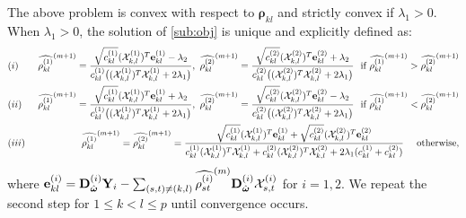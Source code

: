 \documentclass[useAMS,usenatbib,referee]{bio}
\newcommand{\bs}{\boldsymbol}
\begin{document}
{{The above problem is convex with respect to $\bs{\rho}_{kl}$ and strictly convex if $\lambda_1 > 0$. When $\lambda_1 > 0$, the solution of \eqref{sub:obj} is unique and explicitly defined as:
\begin{eqnarray} \nonumber
&(i)&~\displaystyle \widehat{\rho^{(1)}_{kl}}^{(m+1)}
= \frac{\sqrt{c^{(1)}_{kl}}(\mathcal{X}^{(1)}_{k,l})^T{\bf e}^{(1)}_{kl} - \lambda_2 }{c^{(1)}_{kl}\big((\mathcal{X}^{(1)}_{k,l})^T
\mathcal{X}^{(1)}_{k,l}+2\lambda_1\big)},~ 
\widehat{\rho^{(2)}_{kl}}^{(m+1)}
= \frac{\sqrt{c^{(2)}_{kl}}(\mathcal{X}^{(2)}_{k,l})^T{\bf e}^{(2)}_{kl} + \lambda_2 }{c^{(2)}_{kl}\big((\mathcal{X}^{(2)}_{k,l})^T
\mathcal{X}^{(2)}_{k,l}+2\lambda_1 \big)}  ~\mbox{  if  } \widehat{\rho^{(1)}_{kl}}^{(m+1)} > \widehat{\rho^{(2)}_{kl}}^{(m+1)}\\ \nonumber
&(ii)&~\displaystyle \widehat{\rho^{(1)}_{kl}}^{(m+1)}
= \frac{\sqrt{c^{(1)}_{kl}}(\mathcal{X}^{(1)}_{k,l})^T{\bf e}^{(1)}_{kl} + \lambda_2 }{c^{(1)}_{kl}\big((\mathcal{X}^{(1)}_{k,l})^T
\mathcal{X}^{(1)}_{k,l}+2\lambda_1\big)},~ 
\widehat{\rho^{(2)}_{kl}}^{(m+1)}
= \frac{\sqrt{c^{(2)}_{kl}}(\mathcal{X}^{(2)}_{k,l})^T{\bf e}^{(2)}_{kl} - \lambda_2 }{c^{(2)}_{kl}\big((\mathcal{X}^{(2)}_{k,l})^T
\mathcal{X}^{(2)}_{k,l}+2\lambda_1\big)}  ~\mbox{  if  } \widehat{\rho^{(1)}_{kl}}^{(m+1)} < \widehat{\rho^{(2)}_{kl}}^{(m+1)}\\ \nonumber
&(iii)&~\displaystyle \widehat{\rho^{(1)}_{kl}}^{(m+1)}
= \widehat{\rho^{(2)}_{kl}}^{(m+1)}
= \frac{\sqrt{c^{(1)}_{kl}}(\mathcal{X}^{(1)}_{k,l})^T{\bf e}^{(1)}_{kl}+\sqrt{c^{(2)}_{kl}}(\mathcal{X}^{(2)}_{k,l})^T{\bf e}^{(2)}_{kl} }{c^{(1)}_{kl}(\mathcal{X}^{(1)}_{k,l})^T
\mathcal{X}^{(1)}_{k,l}+c^{(2)}_{kl}(\mathcal{X}^{(2)}_{k,l})^T
\mathcal{X}^{(2)}_{k,l}+2\lambda_1(c^{(1)}_{kl}+c^{(2)}_{kl})}  ~~~\mbox{ otherwise},
\end{eqnarray}
where $ {\bf e}^{(i)}_{kl} = {\bf D}_{\hat{\bs{\omega}}}^{(i)}\mathbf{Y}_i - \sum_{(s,t) \neq (k,l)} \widehat{\rho^{(i)}_{st}}^{(m)} {\bf D}_{\hat{\bs{\omega}}}^{(i)} \mathcal{X}^{(i)}_{s,t}$ for $i=1,2$.
We repeat the second step for $1\le k<l \le p$ until convergence occurs.



}}
\end{document}

